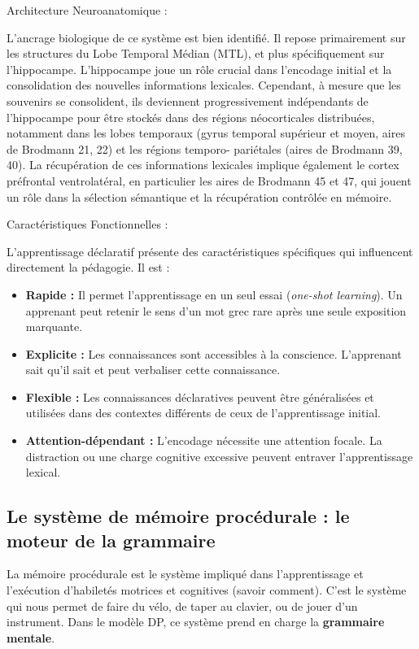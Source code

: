 Architecture Neuroanatomique :

L'ancrage biologique de ce système est bien identifié. Il repose primairement sur les structures du
Lobe Temporal Médian (MTL), et plus spécifiquement sur l'hippocampe. L'hippocampe joue un rôle
crucial dans l'encodage initial et la consolidation des nouvelles informations lexicales. Cependant,
à mesure que les souvenirs se consolident, ils deviennent progressivement indépendants de
l'hippocampe pour être stockés dans des régions néocorticales distribuées, notamment dans les lobes
temporaux (gyrus temporal supérieur et moyen, aires de Brodmann 21, 22) et les régions temporo-
pariétales (aires de Brodmann 39, 40). La récupération de ces informations lexicales implique
également le cortex préfrontal ventrolatéral, en particulier les aires de Brodmann 45 et 47, qui
jouent un rôle dans la sélection sémantique et la récupération contrôlée en mémoire.

Caractéristiques Fonctionnelles :

L'apprentissage déclaratif présente des caractéristiques spécifiques qui influencent directement la
pédagogie. Il est :

\begin{itemize}\item \textbf{Rapide :} Il permet l'apprentissage en un seul essai (\textit{one-shot learning}). Un apprenant peut retenir le sens d'un mot grec rare après une seule exposition marquante.\item \textbf{Explicite :} Les connaissances sont accessibles à la conscience. L'apprenant \og sait qu'il sait\fg{} et peut verbaliser cette connaissance.\item \textbf{Flexible :} Les connaissances déclaratives peuvent être généralisées et utilisées dans des contextes différents de ceux de l'apprentissage initial.\item \textbf{Attention-dépendant :} L'encodage nécessite une attention focale. La distraction ou une charge cognitive excessive peuvent entraver l'apprentissage lexical.\end{itemize}

\subsection{Le système de mémoire procédurale : le moteur de la grammaire}

La mémoire procédurale est le système impliqué dans l'apprentissage et l'exécution d'habiletés
motrices et cognitives (\og savoir comment\fg{}). C'est le système qui nous permet de faire du vélo,
de taper au clavier, ou de jouer d'un instrument. Dans le modèle DP, ce système prend en charge la
\textbf{grammaire mentale}.

